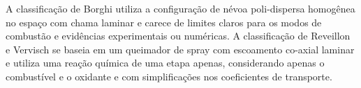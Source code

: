 A classificação de Borghi \cite{Borghi1996} utiliza a configuração de névoa poli-dispersa homogênea no espaço com chama laminar e carece de limites claros para os modos de combustão e evidências experimentais ou numéricas.
A classificação de Reveillon e Vervisch  \cite{ReveillonJ2005} se baseia em um queimador de spray com escoamento co-axial laminar e utiliza uma reação química de uma etapa apenas, considerando apenas o combustível e o oxidante e com simplificações nos coeficientes de transporte.









